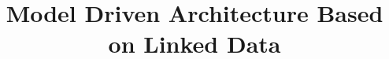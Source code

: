\documentclass[conference,a4paper]{IEEEtran}
\begin{document}

%
\date{}
\title{Model Driven Architecture Based on Linked Data}




%
\end{document}
